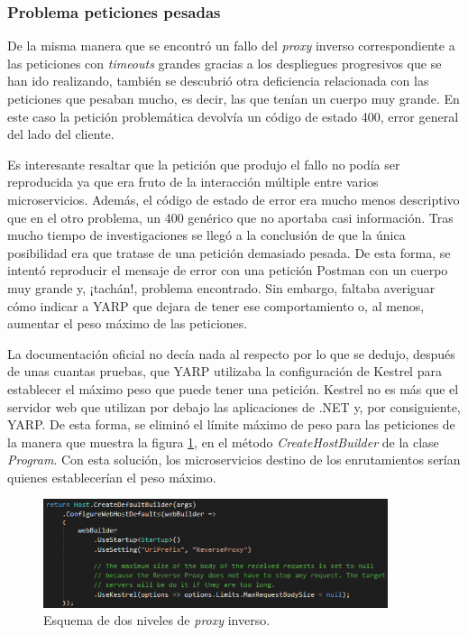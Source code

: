 \documentclass[11pt,spanish,listoffigures]{tfgetsinf}
\begin{document}
			\subsubsection{Problema peticiones pesadas}

De la misma manera que se encontró un fallo del \emph{proxy} inverso correspondiente a las peticiones con \emph{timeouts} grandes gracias a los despliegues progresivos que se han ido realizando, también se descubrió otra deficiencia relacionada con las peticiones que pesaban mucho, es decir, las que tenían un cuerpo muy grande. En este caso la petición problemática devolvía un código de estado 400, error general del lado del cliente.

Es interesante resaltar que la petición que produjo el fallo no podía ser reproducida ya que era fruto de la interacción múltiple entre varios microservicios. Además, el código de estado de error era mucho menos descriptivo que en el otro problema, un 400 genérico que no aportaba casi información. Tras mucho tiempo de investigaciones se llegó a la conclusión de que la única posibilidad era que tratase de una petición demasiado pesada. De esta forma, se intentó reproducir el mensaje de error con una petición Postman con un cuerpo muy grande y, ¡tachán!, problema encontrado. Sin embargo, faltaba averiguar cómo indicar a YARP que dejara de tener ese comportamiento o, al menos, aumentar el peso máximo de las peticiones.

La documentación oficial no decía nada al respecto por lo que se dedujo, después de unas cuantas pruebas, que YARP utilizaba la configuración de Kestrel \cite{Kestrel} para establecer el máximo peso que puede tener una petición. Kestrel no es más que el servidor web que utilizan por debajo las aplicaciones de .NET y, por consiguiente, YARP. De esta forma, se eliminó el límite máximo de peso para las peticiones de la manera que muestra la figura \ref{configuracionKestrel}, en el método \emph{CreateHostBuilder} de la clase \emph{Program}. Con esta solución, los microservicios destino de los enrutamientos serían quienes establecerían el peso máximo.

\begin{figure}[ht]
\centering
\includegraphics[width=0.9\textwidth]{imagenes/configuracionKestrel}
\caption{Esquema de dos niveles de \emph{proxy} inverso.}
	\label{configuracionKestrel}
\end{figure}
\end{document}
